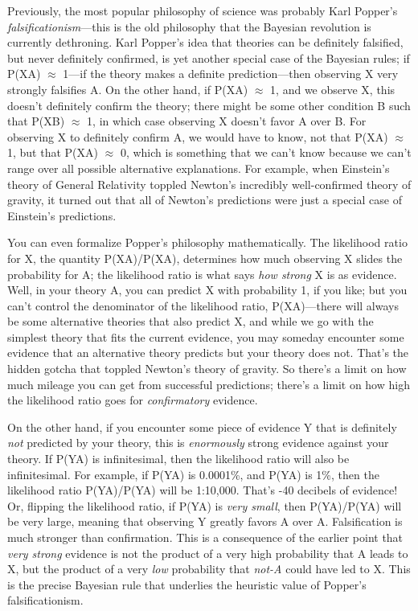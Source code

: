 {
 Previously, the most popular philosophy of science was probably
Karl Popper's \textit{falsificationism}{}---this is the
old philosophy that the Bayesian revolution is currently dethroning.
Karl Popper's idea that theories can be definitely
falsified, but never definitely confirmed, is yet another special case
of the Bayesian rules; if P(X{\textbar}A) ${\approx}$ 1---if the theory
makes a definite prediction---then observing {\textlnot}X very strongly
falsifies A. On the other hand, if P(X{\textbar}A) ${\approx}$ 1, and
we observe X, this doesn't definitely confirm the
theory; there might be some other condition B such that P(X{\textbar}B)
${\approx}$ 1, in which case observing X doesn't favor
A over B. For observing X to definitely confirm A, we would have to
know, not that P(X{\textbar}A) ${\approx}$ 1, but that
P(X{\textbar}{\textlnot}A) ${\approx}$ 0, which is something that we
can't know because we can't range over
all possible alternative explanations. For example, when
Einstein's theory of General Relativity toppled
Newton's incredibly well-confirmed theory of gravity,
it turned out that all of Newton's predictions were
just a special case of Einstein's predictions.}

{
 You can even formalize Popper's philosophy
mathematically. The likelihood ratio for X, the quantity
P(X{\textbar}A)/P(X{\textbar}{\textlnot}A), determines how much
observing X slides the probability for A; the likelihood ratio is what
says \textit{how strong} X is as evidence. Well, in your theory A, you
can predict X with probability 1, if you like; but you
can't control the denominator of the likelihood ratio,
P(X{\textbar}{\textlnot}A)---there will always be some alternative
theories that also predict X, and while we go with the simplest theory
that fits the current evidence, you may someday encounter some evidence
that an alternative theory predicts but your theory does not.
That's the hidden gotcha that toppled
Newton's theory of gravity. So there's
a limit on how much mileage you can get from successful predictions;
there's a limit on how high the likelihood ratio goes
for \textit{confirmatory} evidence.}

{
 On the other hand, if you encounter some piece of evidence Y that
is definitely \textit{not} predicted by your theory, this is
\textit{enormously} strong evidence against your theory. If
P(Y{\textbar}A) is infinitesimal, then the likelihood ratio will also
be infinitesimal. For example, if P(Y{\textbar}A) is 0.0001\%, and
P(Y{\textbar}{\textlnot}A) is 1\%, then the likelihood ratio
P(Y{\textbar}A)/P(Y{\textbar}{\textlnot}A) will be 1:10,000.
That's -40 decibels of evidence! Or, flipping the
likelihood ratio, if P(Y{\textbar}A) is \textit{very small}, then
P(Y{\textbar}{\textlnot}A)/P(Y{\textbar}A) will be very large, meaning
that observing Y greatly favors {\textlnot}A over A. Falsification is
much stronger than confirmation. This is a consequence of the earlier
point that \textit{very strong} evidence is not the product of a very
high probability that A leads to X, but the product of a very
\textit{low} probability that \textit{not-A} could have led to X. This
is the precise Bayesian rule that underlies the heuristic value of
Popper's falsificationism.}


